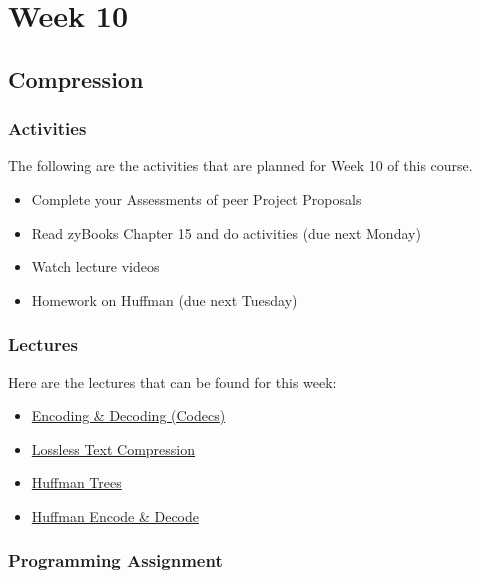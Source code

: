 \clearpage

\chapter{Week 10}

\section{Compression}

\horizontalline

\subsection{Activities}

The following are the activities that are planned for Week 10 of this course.

\begin{itemize}
    \item Complete your Assessments of peer Project Proposals
    \item Read zyBooks Chapter 15 and do activities (due next Monday)
    \item Watch lecture videos
    \item Homework on Huffman (due next Tuesday)
\end{itemize}

\subsection{Lectures}

Here are the lectures that can be found for this week:

\begin{itemize}
    \item \href{https://applied.cs.colorado.edu/mod/hvp/view.php?id=46028}{Encoding \& Decoding (Codecs)}
    \item \href{https://applied.cs.colorado.edu/mod/hvp/view.php?id=46029}{Lossless Text Compression}
    \item \href{https://applied.cs.colorado.edu/mod/hvp/view.php?id=46030}{Huffman Trees}
    \item \href{https://applied.cs.colorado.edu/mod/hvp/view.php?id=46031}{Huffman Encode \& Decode}
\end{itemize}

\subsection{Programming Assignment}


